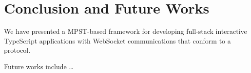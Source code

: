 \documentclass[submission,copyright,creativecommons]{eptcs}
\begin{document}
\section{Conclusion and Future Works}
We have presented a MPST-based framework for developing full-stack interactive TypeScript applications with WebSocket communications that conform to a protocol.

Future works include \dots



%
%
\end{document}
